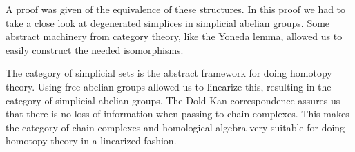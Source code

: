 \documentclass[titlepage, 11pt]{amsproc}
\theoremstyle{plain}
\theoremstyle{definition}
\begin{document}
A proof was given of the equivalence of these structures. In this proof we had to take a close look at degenerated simplices in simplicial abelian groups. Some abstract machinery from category theory, like the Yoneda lemma, allowed us to easily construct the needed isomorphisms.

The category of simplicial sets is the abstract framework for doing homotopy theory. Using free abelian groups allowed us to linearize this, resulting in the category of simplicial abelian groups. The Dold-Kan correspondence assures us that there is no loss of information when passing to chain complexes. This makes the category of chain complexes and homological algebra very suitable for doing homotopy theory in a linearized fashion.

\newpage

\nocite{*}

	
\end{document}
